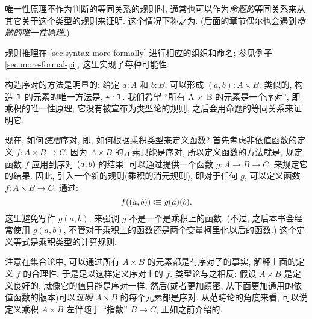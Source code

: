 \begin{rmk}
\begin{enumerate}
        唯一性原理不作为判断的等同关系的规则时, 通常也可以作为\emph{命题的}等同关系来从其它关于这个类型的规则来证明.
        这个情况下称之为.
        (后面的章节偶尔也会遇到\emph{命题的唯一性原理}.)
    \end{enumerate}
    规则推理在 \cref{sec:syntax-more-formally} 进行相应的组织和命名;
    参见例子 \cref{sec:more-formal-pi}, 这里实现了每种可能性.
\end{rmk}

构造序对的方法是明显的: 给定 $a:A$ 和 $b:B$, 可以形成 $(a,b):A\times B$.
类似的, 构造 $\mathbf{1}$ 的元素的唯一方法是, $\star:\mathbf{1}$.
我们希望 ``所有 A × B 的元素是一个序对'', 即乘积的唯一性原理;
它没有被宣布为类型论的规则, 之后会用命题的等同关系来证明它.

现在, 如何\emph{使用}序对, 即, 如何根据乘积类型来定义函数?
首先考虑非依值函数的定义 $f : A\times B \to C$.
因为 $A\times B$ 的元素只能是序对, 所以定义函数的方法就是, 规定函数 $f$ 应用到序对 $(a,b)$ 的结果.
可以通过提供一个函数 $g : A \to B \to C$, 来规定它的结果.
因此, 引入一个新的规则(乘积的消元规则), 即对于任何 $g$, 可以定义函数 $f : A\times B \to C$, 通过:
\[
    f((a,b)) \vcentcolon\equiv g(a)(b).
\]
这里避免写作 $g(a,b)$, 来强调 $g$ 不是一个是乘积上的函数.
(不过, 之后本书会经常使用 $g(a,b)$, 不管对于乘积上的函数还是两个变量柯里化以后的函数.)
这个定义等式是乘积类型的计算规则.

注意在集合论中, 可以通过所有 $A\times B$ 的元素都是有序对子的事实, 解释上面的定义 $f$ 的合理性.
于是足以这样定义序对上的 $f$.
类型论与之相反: 假设 $A\times B$ 是定义良好的, 就像它的值只能是序对一样, 然后(或者更加缜密, 从下面更加通用的依值函数的版本)可以\emph{证明} $A\times B$ 的每个元素都是序对.
从范畴论的角度来看, 可以说定义乘积 $A\times B$ 左伴随于 ``指数'' $B\to C$, 正如之前介绍的.


